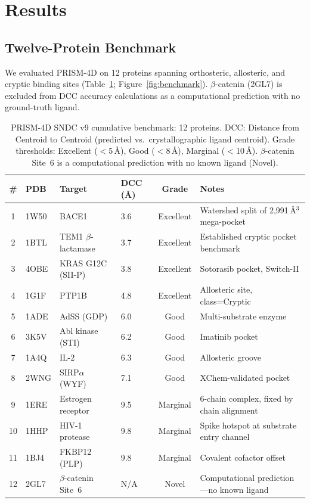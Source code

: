 \documentclass{sn-jnl}
\begin{document}
\section{Results}

\subsection{Twelve-Protein Benchmark}

We evaluated PRISM-4D on 12 proteins spanning orthosteric, allosteric, and cryptic binding
sites (Table~\ref{tab:benchmark}; Figure~\ref{fig:benchmark}). $\beta$-catenin (2GL7) is
excluded from DCC accuracy calculations as a computational prediction with no ground-truth
ligand.

\begin{table}[t]
\centering
\caption{PRISM-4D SNDC v9 cumulative benchmark: 12 proteins. DCC: Distance from Centroid to
Centroid (predicted vs.\ crystallographic ligand centroid). Grade thresholds: Excellent
($<$5\,\AA{}), Good ($<$8\,\AA{}), Marginal ($<$10\,\AA{}). $\beta$-catenin Site~6 is a
computational prediction with no known ligand (Novel).}
\label{tab:benchmark}
\begin{tabular}{clllcl}
\toprule
\textbf{\#} & \textbf{PDB} & \textbf{Target} & \textbf{DCC (\AA{})} &
\textbf{Grade} & \textbf{Notes} \\
\midrule
1  & 1W50 & BACE1             & 3.6 & Excellent & Watershed split of 2{,}991\,\AA$^3$ mega-pocket \\
2  & 1BTL & TEM1 $\beta$-lactamase & 3.7 & Excellent & Established cryptic pocket benchmark \\
3  & 4OBE & KRAS G12C (SII-P) & 3.8 & Excellent & Sotorasib pocket, Switch-II \\
4  & 1G1F & PTP1B             & 4.8 & Excellent & Allosteric site, class=Cryptic \\
5  & 1ADE & AdSS (GDP)        & 6.0 & Good      & Multi-substrate enzyme \\
6  & 3K5V & Abl kinase (STI)  & 6.2 & Good      & Imatinib pocket \\
7  & 1A4Q & IL-2              & 6.3 & Good      & Allosteric groove \\
8  & 2WNG & SIRP$\alpha$ (WYF)& 7.1 & Good      & XChem-validated pocket~\cite{sirpa_xchem2025} \\
9  & 1ERE & Estrogen receptor & 9.5 & Marginal  & 6-chain complex, fixed by chain alignment \\
10 & 1HHP & HIV-1 protease    & 9.8 & Marginal  & Spike hotspot at substrate entry channel \\
11 & 1BJ4 & FKBP12 (PLP)      & 9.8 & Marginal  & Covalent cofactor offset \\
12 & 2GL7 & $\beta$-catenin Site~6 & N/A & Novel & Computational prediction---no known ligand \\
\bottomrule
\end{tabular}
\end{table}
\end{document}

